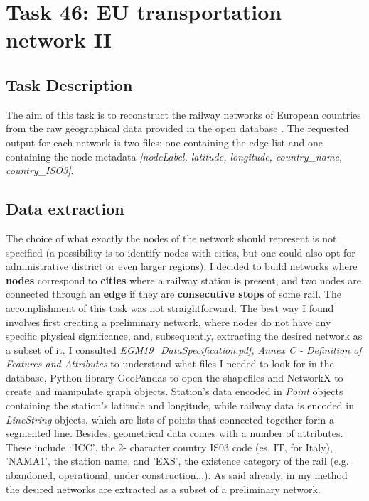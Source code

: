 \chapter{Task 46: EU transportation network II}
\section{Task Description}
The aim of this task is to reconstruct the railway networks of European countries from the raw geographical data provided in the open database
\parencite[][ \textit{EuroGlobalMap}, $2019$ release]{euroglobalmap}. The requested output for each network is two files: one containing the edge list and one containing the node metadata \textit{[nodeLabel, latitude, longitude, country\_name, country\_ISO3]}.
\section{Data extraction}
The choice of what exactly the nodes of the network should represent is not specified (a possibility is to identify nodes with cities, but one could also opt for administrative district or even larger regions).
I decided to build networks where \textbf{nodes} correspond to \textbf{cities} where a railway station is present, and two nodes are connected through an \textbf{edge}  if they are \textbf{consecutive stops} of some rail. The accomplishment of this task was not straightforward. The best way I found involves first creating a preliminary network, where nodes do not have any specific physical significance, and, subsequently, extracting the desired network as a subset of it. \newline \noindent
I consulted \textit{EGM19\_DataSpecification.pdf, 
 Annex C - Definition of Features and Attributes} to understand what files I needed to look for in the database, Python library GeoPandas to open the shapefiles and NetworkX to create and manipulate graph objects. Station's data encoded in \textit{Point} objects containing the station's latitude and longitude, while railway data is encoded in \textit{LineString} objects, which are lists of points that connected together form a segmented line.
Besides, geometrical data comes with a number of attributes. These include :'ICC', the 2- character country IS03 code (es. IT, for Italy),  'NAMA1', the station name, and 'EXS', the existence category of the rail (e.g. abandoned, operational, under construction...).
\medskip \newline \noindent
As said already, in my method the desired networks are extracted as a subset of a preliminary network. 
